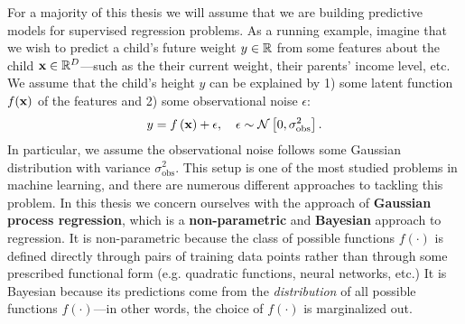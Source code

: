 For a majority of this thesis we will assume that we are building predictive models for supervised regression problems.
As a running example, imagine that we wish to predict a child's future weight $y \in \mathbb{R}$ from some features about the child $\mathbf{x} \in \mathbb{R}^{D}$---such as the their current weight, their parents' income level, etc.
We assume that the child's height $y$ can be explained by 1) some latent function $f(\mathbf{x})$ of the features and 2) some observational noise $\epsilon$:
%
\begin{equation}
  y = f \left( \bx \right) + \epsilon, \quad \epsilon \sim \normaldist{0}{\sigma_\text{obs}^2}.
  \label{eqn:regression}
\end{equation}
%
In particular, we assume the observational noise follows some Gaussian distribution with variance $\sigma_\text{obs}^2$.
%
This setup is one of the most studied problems in machine learning, and there are numerous different approaches to tackling this problem.
In this thesis we concern ourselves with the approach of {\bf Gaussian process regression}, which is a {\bf non-parametric} and {\bf Bayesian} approach to regression.
It is non-parametric because the class of possible functions $f(\cdot)$ is defined directly through pairs of training data points
rather than through some prescribed functional form (e.g. quadratic functions, neural networks, etc.)
It is Bayesian because its predictions come from the \emph{distribution} of all possible functions $f(\cdot)$---in other words, the choice of $f(\cdot)$ is marginalized out.
